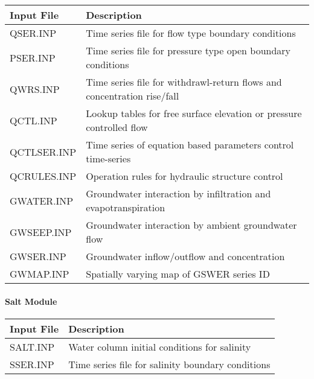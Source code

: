 \documentclass[letterpaper,10pt,english]{sphinxmanual}
\begin{document}
\begin{savenotes}\sphinxattablestart
\centering
\begin{tabulary}{\linewidth}[t]{|T|T|}
\hline
\sphinxstyletheadfamily 
Input File
&\sphinxstyletheadfamily 
Description
\\
\hline
QSER.INP
&
Time series file for flow type boundary conditions
\\
\hline
PSER.INP
&
Time series file for pressure type open boundary conditions
\\
\hline
QWRS.INP
&
Time series file for withdrawl-return flows and concentration rise/fall
\\
\hline
QCTL.INP
&
Lookup tables for free surface elevation or pressure controlled flow
\\
\hline
QCTLSER.INP
&
Time series of equation based parameters control time-series
\\
\hline
QCRULES.INP
&
Operation rules for hydraulic structure control
\\
\hline
GWATER.INP
&
Groundwater interaction by infiltration and evapotranspiration
\\
\hline
GWSEEP.INP
&
Groundwater interaction by ambient groundwater flow
\\
\hline
GWSER.INP
&
Groundwater inflow/outflow and concentration
\\
\hline
GWMAP.INP
&
Spatially varying map of GSWER series ID
\\
\hline
\end{tabulary}
\par
\sphinxattableend\end{savenotes}


\paragraph{Salt Module}
\label{\detokenize{inputfiles/general_transport/salinity:salt-module}}\label{\detokenize{inputfiles/general_transport/salinity:salinity}}\label{\detokenize{inputfiles/general_transport/salinity::doc}}

\begin{savenotes}\sphinxattablestart
\centering
\begin{tabulary}{\linewidth}[t]{|T|T|}
\hline
\sphinxstyletheadfamily 
Input File
&\sphinxstyletheadfamily 
Description
\\
\hline
SALT.INP
&
Water column initial conditions for salinity
\\
\hline
SSER.INP
&
Time series file for salinity boundary conditions
\\
\hline
\end{tabulary}
\par
\sphinxattableend\end{savenotes}
\end{document}
